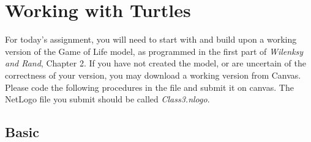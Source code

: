 \documentclass[11pt,oneside]{book}
\begin{document}
\chapter{Working with Turtles}

For today's assignment, you will need to start with and build upon a working version of the Game of Life model, as programmed in the first part of {\it Wilenksy and Rand}, Chapter 2. If you have not created the model, or are uncertain of the correctness of your version, you may download a working version from Canvas. Please code the following procedures in the file and submit it on canvas. The NetLogo file you submit should be called {\it Class3.nlogo}.

\section{Basic}
\end{document}
